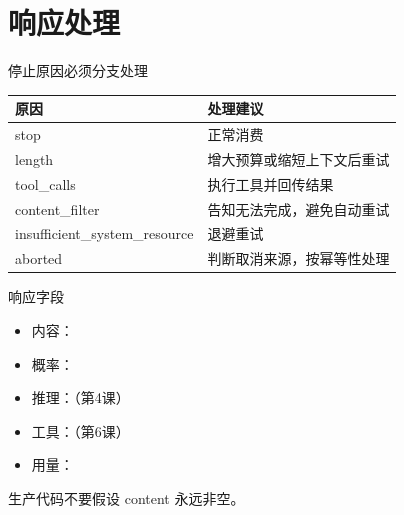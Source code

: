\documentclass[aspectratio=169,UTF8]{ctexbeamer}
\begin{document}
\section{响应处理}
\begin{frame}{停止原因必须分支处理}
\begin{tabular}{ll}
\toprule
原因 & 处理建议\\
\midrule
stop & 正常消费\\
length & 增大预算或缩短上下文后重试\\
tool\_calls & 执行工具并回传结果\\
content\_filter & 告知无法完成，避免自动重试\\
insufficient\_system\_resource & 退避重试\\
aborted & 判断取消来源，按幂等性处理\\
\bottomrule
\end{tabular}
\end{frame}
\begin{frame}{响应字段}
\begin{itemize}
  \item 内容：
  \item 概率：
  \item 推理：（第4课）
  \item 工具：（第6课）
  \item 用量：
\end{itemize}
生产代码不要假设 content 永远非空。
\end{frame}
\end{document}

